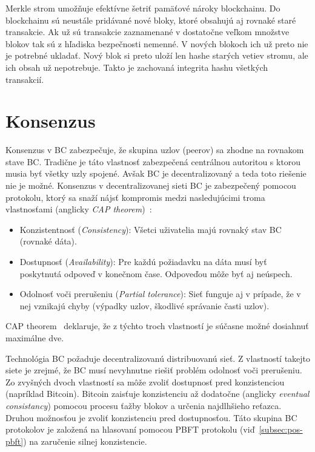 Merkle strom umožňuje efektívne šetriť pamäťové nároky blockchainu. Do blockchainu sú neustále pridávané nové bloky, ktoré obsahujú aj rovnaké staré transakcie. Ak už sú transakcie zaznamenané v dostatočne veľkom množstve blokov tak sú z hľadiska bezpečnosti nemenné. V nových blokoch ich už preto nie je potrebné ukladať. Nový blok si preto uloží len hashe starých vetiev stromu, ale ich obsah už nepotrebuje. Takto je zachovaná integrita hashu všetkých transakcií.~\cite{satoshiBitcoin}


\chapter{Konsenzus}\label{chap:consenzus}

Konsenzus v BC zabezpečuje, že skupina uzlov (peerov) sa  zhodne na rovnakom stave BC. Tradične je táto vlastnosť zabezpečená centrálnou autoritou s ktorou musia byť všetky uzly spojené. Avšak BC je decentralizovaný a teda toto riešenie nie je možné. Konsenzus v decentralizovanej sieti BC je zabezpečený pomocou protokolu, ktorý sa snaží nájsť kompromis medzi nasledujúcimi troma vlastnosťami (anglicky \textit{CAP theorem})~\cite{gilbertCAP, zhangConsensus, leporeConsensus}:
\begin{itemize}
	\item Konzistentnosť (\textit{Consistency}): Všetci uživatelia majú rovnaký stav BC (rovnaké dáta).
	\item Dostupnosť (\textit{Availability}): Pre každú požiadavku na dáta musí byť poskytnutá odpoveď v konečnom čase. Odpoveďou môže byť aj neúspech.
	\item Odolnosť voči prerušeniu (\textit{Partial tolerance}): Sieť funguje aj v prípade, že v nej vznikajú chyby (výpadky uzlov, škodlivé správanie časti uzlov).
\end{itemize}
CAP theorem~\cite{gilbertCAP} deklaruje, že z týchto troch vlastností je súčasne možné dosiahnuť maximálne dve.

Technológia BC požaduje decentralizovanú distribuovanú sieť. Z vlastností takejto siete je zrejmé, že BC musí nevyhnutne riešiť problém odolnosť voči prerušeniu. Zo zvyšných dvoch vlastností sa môže zvoliť dostupnosť pred konzistenciou (napríklad Bitcoin). Bitcoin zaisťuje konzistenciu až dodatočne (anglicky \textit{eventual consistancy}) pomocou procesu ťažby blokov a určenia najdlhšieho reťazca. Druhou možnosťou je zvoliť konzistenciu pred dostupnosťou. Táto skupina BC protokolov je založená na hlasovaní pomocou PBFT protokolu (viď~\ref{subsec:pos-pbft}) na zaručenie silnej konzistencie.~\cite{capViswanath}

